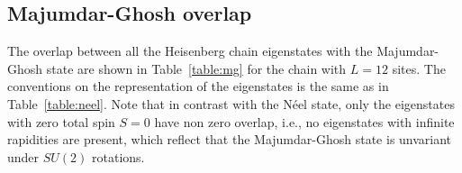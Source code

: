 \documentclass[11pt]{iopart}
\begin{document}
\subsection{Majumdar-Ghosh overlap}
\label{app-mg}

The overlap between all the Heisenberg chain eigenstates with the Majumdar-Ghosh state are shown in 
Table~\ref{table:mg} for the chain with $L=12$ sites. The conventions on the representation of 
the eigenstates is the same as in Table~\ref{table:neel}. Note that in contrast with the N\'eel 
state, only the eigenstates with zero total spin $S=0$ have non zero overlap, i.e., no eigenstates 
with infinite rapidities are present, which reflect that the Majumdar-Ghosh state is unvariant 
under $SU(2)$ rotations. 


\end{document}
